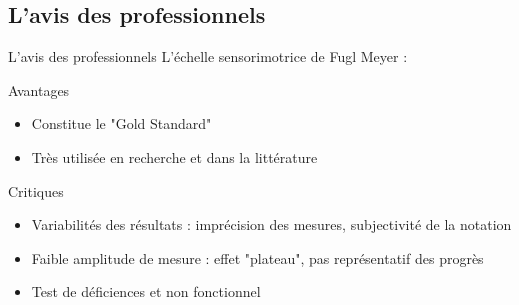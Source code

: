 \subsection{L'avis des professionnels}
\begin{frame}{L'avis des professionnels}
L'échelle sensorimotrice de Fugl Meyer :
	\begin{exampleblock}{Avantages}
			\begin{itemize}
			\item Constitue le "Gold Standard"  \pause
			\item Très utilisée en recherche et dans la littérature 
		\end{itemize}  \pause
	\end{exampleblock}
	\begin{alertblock}{Critiques}
			\begin{itemize}
			\item Variabilités des résultats : imprécision des mesures, subjectivité de la notation  \pause
			\item Faible amplitude de mesure : effet "plateau", pas représentatif des progrès   \pause
			\item Test de déficiences et non fonctionnel
		\end{itemize}
	\end{alertblock}	
\end{frame}